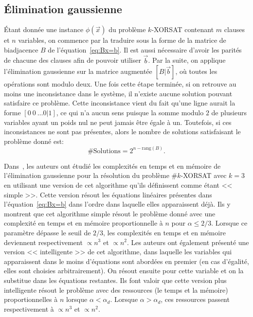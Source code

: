 
\subsection{Élimination gaussienne}\label{subsec:GE}
Étant donnée une instance $\phi(\vec{x})$ du problème $k$-XORSAT contenant $m$ clauses et $n$ variables, on commence par la traduire sous la forme de la matrice de biadjacence $B$ de l'équation~\ref{eq:Bx=b}.
Il est aussi nécessaire d'avoir les parités de chacune des clauses afin de pouvoir utiliser $\vec{b}$.
Par la suite, on applique l'élimination gaussienne sur la matrice augmentée $[B|\vec{b}]$, où toutes les opérations sont modulo deux.
Une fois cette étape terminée, si on retrouve au moins une inconsistance dans le système, il n'existe aucune solution pouvant satisfaire ce problème.
Cette inconsistance vient du fait qu'une ligne aurait la forme $[0\ 0\ \dots 0 | 1]$, ce qui n'a aucun sens puisque la somme modulo $2$ de plusieurs variables ayant un poids nul ne peut jamais être égale à un.
Toutefois, si ces inconsistances ne sont pas présentes, alors le nombre de solutions satisfaisant le problème donné est:
\begin{equation}\label{eq:nb_sols_ge}
    \text{\#Solutions} = 2^{n - \mathrm{rang}(B)}.
\end{equation}

Dans~\cite{braunstein_complexity_2002}, les auteurs ont étudié les complexités en temps et en mémoire de l'élimination gaussienne pour la résolution du problème \#$k$-XORSAT avec $k = 3$ en utilisant une version de cet algorithme qu'ils définissent comme étant << simple >>.
Cette version résout les équations linéaires présentes dans l'équation~\ref{eq:Bx=b} dans l'ordre dans laquelle elles apparaissent déjà.
Ils y montrent que cet algorithme simple résout le problème donné avec une complexité en temps et en mémoire proportionnelle à $n$ pour $\alpha \leq 2/3$.
Lorsque ce paramètre dépasse le seuil de $2/3$, les complexités en temps et en mémoire deviennent respectivement $\propto n^3$ et $\propto n^2$.
Les auteurs ont également présenté une version << intelligente >> de cet algorithme, dans laquelle les variables qui apparaissent dans le moins d'équations sont abordées en premier (en cas d'égalité, elles sont choisies arbitrairement).
On résout ensuite pour cette variable et on la substitue dans les équations restantes.
Ils font valoir que cette version plus intelligente résout le problème avec des ressources (le temps et la mémoire) proportionnelles à $n$ lorsque $\alpha < \alpha_d$.
Lorsque $\alpha > \alpha_d$, ces ressources passent respectivement à $\propto n^3$ et $\propto n^2$.

